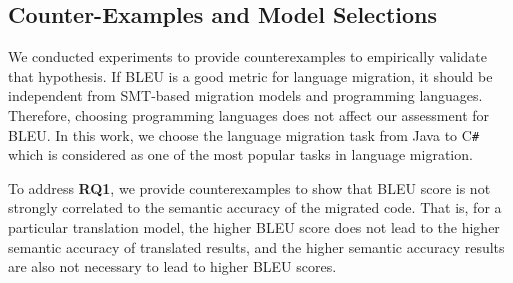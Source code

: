 \subsection{Counter-Examples and Model Selections}



We conducted experiments to provide counterexamples to empirically
validate that hypothesis. If BLEU is a good metric for language
migration, it should be independent from SMT-based migration models
and programming languages. Therefore, choosing programming languages
does not affect our assessment for BLEU. In this work, we choose the
language migration task from Java to C\texttt{\#} which is considered
as one of the most popular tasks in language migration.

%
%
To address {\bf RQ1}, we provide counterexamples to show that BLEU score is
not strongly correlated to the semantic accuracy of the migrated
code. That is, for a particular translation model, the higher BLEU
score does not lead to the higher semantic accuracy of translated
results, and the higher semantic accuracy results are also not
necessary to lead to higher BLEU scores.
%
%
%

